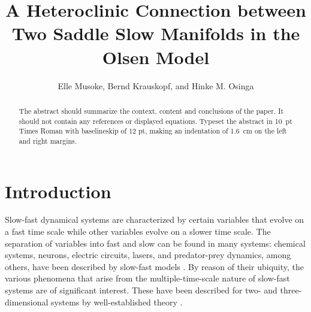 \documentclass{ws-ijbc}
\begin{document}
\catchline{}{}{}{}{} %


\title{A Heteroclinic Connection between \\ Two Saddle Slow Manifolds in the Olsen Model}

\author{Elle Musoke, Bernd Krauskopf, and Hinke M. Osinga}


\address{Department of Mathematics, University of Auckland, Private Bag 92019\\
Auckland, 1142, New Zealand\\
elle.musoke@auckland.ac.nz}

\maketitle

\begin{history}
\end{history}

\begin{abstract}
The abstract should summarize the context, content and conclusions
of the paper. It should not contain any references or displayed
equations. Typeset the abstract in 10~pt Times Roman with
baselineskip of 12 pt, making an indentation of 1.6~cm on the left
and right margins.
\end{abstract}

\section{Introduction}

Slow-fast dynamical systems are characterized by certain variables that evolve on a fast time scale while other variables evolve on a slower time scale.  The separation of variables into fast and slow can be found in many systems: chemical systems, neurons, electric circuits, lasers, and predator-prey dynamics, among others, have been described by slow-fast models  \cite{BZ_reaction, Neurons,Circuits, lasers, Predator-Prey}.  By reason of their ubiquity, the various phenomena that arise from the multiple-time-scale nature of slow-fast systems are of significant interest. These have been described for two- and three-dimensional systems by well-established theory \cite{canard_explosion, lents-rapides, enlacement,singular_hopf, folded_node,three}.
\end{document}
